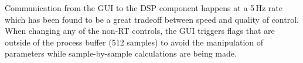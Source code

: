 \documentclass[twoside,a4paper]{article}
\begin{document}
    Communication from the GUI to the DSP component happens at a 5\,Hz rate which has been found to be a great tradeoff between speed and quality of control. When changing any of the non-RT controls, the GUI triggers flags that are outside of the process buffer (512 samples) to avoid the manipulation of parameters while sample-by-sample calculations are being made. 

\begin{figure}[t!]
    \centering
     \hfill
     \hfill
     \hfill

\end{figure}
\end{document}
